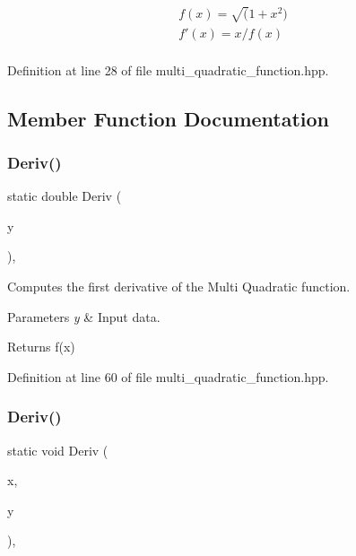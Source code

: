 \begin{eqnarray*} f(x) = \sqrt(1 + x^2) \\ f'(x) = x / f(x) \\ \end{eqnarray*} 

Definition at line 28 of file multi\+\_\+quadratic\+\_\+function.\+hpp.



\subsection{Member Function Documentation}
\mbox{\label{classmlpack_1_1ann_1_1MultiQuadFunction_a163d34fd09f8edf457164f5033c635cf}} 
\subsubsection{Deriv()\hspace{0.1cm}{\footnotesize\ttfamily [1/2]}}
{\footnotesize\ttfamily static double Deriv (\begin{DoxyParamCaption}\item[{const double}]{y }\end{DoxyParamCaption})\hspace{0.3cm}{\ttfamily [inline]}, {\ttfamily [static]}}



Computes the first derivative of the Multi Quadratic function. 


\begin{DoxyParams}{Parameters}
{\em y} & Input data. \\
\hline
\end{DoxyParams}
\begin{DoxyReturn}{Returns}
f\textquotesingle{}(x) 
\end{DoxyReturn}


Definition at line 60 of file multi\+\_\+quadratic\+\_\+function.\+hpp.

\mbox{\label{classmlpack_1_1ann_1_1MultiQuadFunction_a0ad035ec996acd7025807d0e9e082887}} 
\subsubsection{Deriv()\hspace{0.1cm}{\footnotesize\ttfamily [2/2]}}
{\footnotesize\ttfamily static void Deriv (\begin{DoxyParamCaption}\item[{const Input\+Vec\+Type \&}]{x,  }\item[{Output\+Vec\+Type \&}]{y }\end{DoxyParamCaption})\hspace{0.3cm}{\ttfamily [inline]}, {\ttfamily [static]}}



